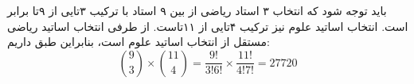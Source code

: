 \p
باید توجه شود که انتخاب ۳ استاد ریاضی از بین ۹ استاد با ترکیب ۳‌تایی از ۹‌تا برابر است. انتخاب اساتید علوم نیز ترکیب ۴‌تایی از ۱۱‌تاست. از طرفی انتخاب اساتید ریاضی مستقل از انتخاب اساتید علوم است، بنابراین طبق 
 داریم:
    $${9\choose 3}\times {11\choose 4} = \frac{9!}{3!6!}\times \frac{11!}{4!7!} = 27720$$
